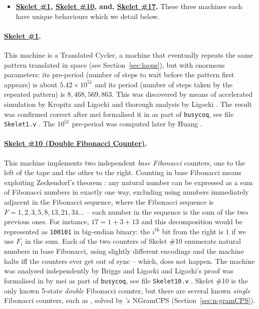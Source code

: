 \begin{itemize}
    \item \textbf{\href{https://bbchallenge.org/1RB1RD_1LC0RC_1RA1LD_0RE0LB_---1RC}{Skelet \#1}, \href{https://bbchallenge.org/1RB0RA_0LC1RA_1RE1LD_1LC0LD_---0RB}{Skelet \#10}, and, \href{https://bbchallenge.org/1RB---_0LC1RE_0LD1LC_1RA1LB_0RB0RA}{Skelet \#17}.} These three machines each have unique behaviours which we detail below.
\end{itemize}
\vspace{-1.5em}
\paragraph{\href{https://bbchallenge.org/1RB1RD_1LC0RC_1RA1LD_0RE0LB_---1RC}{Skelet \#1}.} This machine is a Translated Cycler, \ie a machine that eventually repeats the same pattern translated in space (see Section~\ref{sec:loops}), but with enormous parameters: its pre-period (number of steps to wait before the pattern first appears) is about $5.42 \times 10^{51}$ and its period (number of steps taken by the repeated pattern) is $8,468,569,863$. This was discovered by means of accelerated simulation by Kropitz and Ligocki \cite{uniSk1} and thorough analysis by Ligocki \cite{ShawnSkelet1Before, ShawnSkelet1}. The result was confirmed correct after mei formalised it in \Coq as part of \texttt{busycoq}, see file \texttt{Skelet1.v} \cite{busycoq}. The $10^{51}$ pre-period was computed later by Huang \cite{hipparcosSk1}.
\vspace{-0.5em}
\paragraph{\href{https://bbchallenge.org/1RB0RA_0LC1RA_1RE1LD_1LC0LD_---0RB}{Skelet \#10 (Double Fibonacci Counter)}.} This machine implements two independent \textit{base Fibonacci} counters, one to the left of the tape and the other to the right. Counting in base Fibonacci means exploiting Zeckendorf's theorem \cite{wiki:Zeckendorf's_theorem}: any natural number can be expressed as a sum of Fibonacci numbers in exactly one way, excluding using numbers immediately adjacent in the Fibonacci sequence, where the Fibonacci sequence is $F = 1,2,3,5,8,13,21,34\dots$ -- each number in the sequence is the sum of the two previous ones. For instance, $17 = 1 + 3 + 13$ and this decomposition would be represented as \texttt{100101} in big-endian binary: the $i^\text{th}$ bit from the right is $1$ if we use $F_i$ in the sum. Each of the two counters of Skelet \#10 enumerate natural numbers in base Fibonacci, using slightly different encodings and the machine halts iff the counters ever get out of sync -- which, does not happen. The machine was analysed independently by Briggs and Ligocki \cite{DanBriggs,ShawnSkelet10} and Ligocki's proof \cite{ShawnSkelet10} was formalised in \Coq by mei as part of \texttt{busycoq}, see file \texttt{Skelet10.v} \cite{busycoq}. Skelet \#10 is the only known 5-state \textit{double} Fibonacci counter, but there are several known \textit{single} Fibonacci counters, such as , solved by \CoqBB's NGramCPS (Section~\ref{sec:n-gramCPS}).

